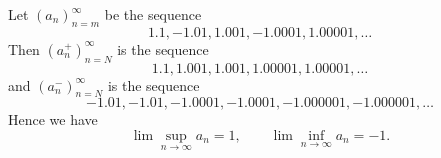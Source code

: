 \begin{exm}
  Let $(a_n)_{n=m}^{\infty}$ be the sequence
  \begin{displaymath}
    1.1, -1.01, 1.001, -1.0001, 1.00001, \ldots
  \end{displaymath}
  Then $(a_n^+)_{n=N}^{\infty}$ is the sequence
  \begin{displaymath}
    1.1, 1.001, 1.001, 1.00001, 1.00001, \ldots
  \end{displaymath}
  and $(a_n^-)_{n=N}^{\infty}$ is the sequence
  \begin{displaymath}
    -1.01, -1.01, -1.0001, -1.0001, -1.000001, -1.000001, \ldots
  \end{displaymath}
  Hence we have
  \begin{displaymath}
    \lim \sup_{n\rightarrow \infty} a_n = 1, \qquad
    \lim \inf_{n\rightarrow \infty} a_n = -1.
  \end{displaymath}
\end{exm}

